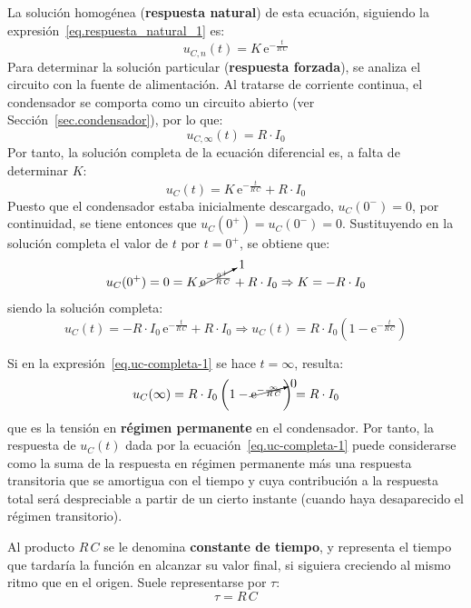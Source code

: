 \documentclass[11pt]{book} %
\begin{document}
	La solución homogénea (\textbf{respuesta natural}) de esta ecuación, siguiendo la expresión~\eqref{eq.respuesta_natural_1} es:
	\begin{equation}
	    \boxed{u_{C,n}(t)=K\,\mathrm{e}^{-\frac{t}{R\,C}}}
	\end{equation}
	Para determinar la solución particular (\textbf{respuesta forzada}), se analiza el circuito con la fuente de alimentación. Al tratarse de corriente continua, el condensador se comporta como un circuito abierto (ver Sección~\ref{sec.condensador}), por lo que:
	\begin{equation}
	    \boxed{u_{C,\infty}(t)=R\cdot I_0}
	\end{equation}
	Por tanto, la solución completa de la ecuación diferencial es, a falta de determinar $K$:
	\begin{equation*}{u_C(t)=K\,\mathrm{e}^{-\frac{t}{R\,C}}+R\cdot I_0}
	\end{equation*}
	Puesto que el condensador estaba inicialmente descargado,  $u_C(0^-)=0$, por continuidad, se tiene entonces que $u_C(0^+)=u_C(0^-)=0$. Sustituyendo en la solución completa el valor de $t$ por $t=0^+$, se obtiene que:
	\begin{equation*}
	    u_C(0^+)=0=K\,\cancelto{1}{\mathrm{e}^{-\frac{0^+}{R\,C}}}+R\cdot I_0\Rightarrow K=-R\cdot I_0
	\end{equation*}
	siendo la solución completa:
	\begin{equation}\label{eq.uc-completa-1}
	    u_C(t)=-R\cdot I_0\,\mathrm{e}^{-\frac{t}{R\,C}}+R\cdot I_0\Rightarrow \boxed{u_C(t) =R\cdot I_0\left(1- \mathrm{e}^{-\frac{t}{R\,C}}\right)}
	\end{equation}
	
	Si en la expresión~\eqref{eq.uc-completa-1} se hace $t=\infty$, resulta:
	\begin{equation*}
	    u_C(\infty)=R\cdot I_0\left(1- \cancelto{0}{\mathrm{e}^{-\frac{\infty}{R\,C}}}\right)=R\cdot I_0
	\end{equation*}
	que es la tensión en \textbf{régimen permanente} en el condensador. Por tanto, la respuesta de $u_C(t)$ dada por la ecuación~\eqref{eq.uc-completa-1} puede considerarse como la suma de la respuesta en régimen permanente más una respuesta transitoria que se amortigua con el tiempo y cuya contribución a la respuesta total será despreciable a partir de un cierto instante (cuando haya desaparecido el régimen transitorio). 
	
	Al producto $R\,C$ se le denomina \textbf{constante de tiempo}, y representa el tiempo que tardaría la función en alcanzar su valor final, si siguiera creciendo al mismo ritmo que en el origen. Suele representarse por $\tau$:
	\begin{equation}
	    \boxed{\tau=R\,C}
	\end{equation}
\end{document}
